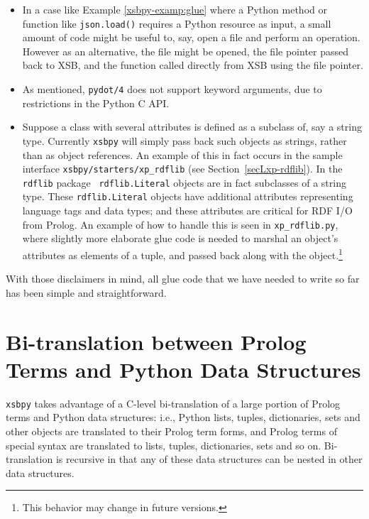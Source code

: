 \begin{itemize}
\item In a case like Example \ref{xsbpy-examp:glue} where a Python
  method or function like {\tt json.load()} requires a Python resource
  as input, a small amount of code might be useful to, say, open a
  file and perform an operation.  However as an alternative, the file
  might be opened, the file pointer passed back to XSB, and the
  function called directly from XSB using the file pointer.

  \item As mentioned, {\tt pydot/4} does not support keyword
    arguments, due to restrictions in the Python C API.

  \item Suppose a class with several attributes is defined as a
    subclass of, say a string type.  Currently {\tt xsbpy} will simply
    pass back such objects as strings, rather than as object
    references.  An example of this in fact occurs in the sample
    interface {\tt xsbpy/starters/xp\_rdflib} (see
    Section~\ref{secLxp-rdflib}).  In the {\tt rdflib} package {\tt
      rdflib.Literal} objects are in fact subclasses of a string type.
    These {\tt rdflib.Literal} objects have additional attributes
    representing language tags and data types; and these attributes
    are critical for RDF I/O from Prolog.  An example of how to handle
    this is seen in {\tt xp\_rdflib.py}, where slightly more elaborate
    glue code is needed to marshal an object's attributes as elements
    of a tuple, and passed back along with the object.\footnote{This
      behavior may change in future versions.}
\end{itemize}

With those disclaimers in mind, all glue code that we have needed to
write so far has been simple and straightforward.

\section{Bi-translation between Prolog Terms and Python Data Structures} \label{sec:bi-translation}

{\tt xsbpy} takes advantage of a C-level bi-translation of a large
portion of Prolog terms and Python data structures: i.e., Python
lists, tuples, dictionaries, sets and other objects are translated to
their Prolog term forms, and Prolog terms of special syntax are
translated to lists, tuples, dictionaries, sets and so on.
Bi-translation is recursive in that any of these data structures can
be nested in other data structures.
     
